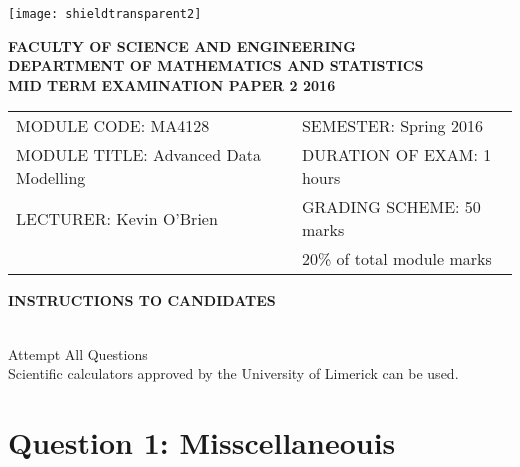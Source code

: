 \documentclass{article}
\begin{document}
{
	\large
\begin{center}
       \texttt{[image: shieldtransparent2]}
\end{center}

\begin{center}
\vspace{1cm}
\large \bf {FACULTY OF SCIENCE AND ENGINEERING} \\[0.5cm]
\normalsize DEPARTMENT OF MATHEMATICS AND STATISTICS \\[1.25cm]
\large \bf {MID TERM EXAMINATION PAPER 2 2016} \\[1.5cm]
\end{center}

\begin{tabular}{ll}
MODULE CODE: MA4128 & SEMESTER: Spring 2016 \\[1cm]
MODULE TITLE: Advanced Data Modelling & DURATION OF EXAM: 1 hours \\[1cm]
LECTURER: Kevin O'Brien & GRADING SCHEME: 50 marks \\
&  \normalsize {20\% of total module marks} \\[0.7cm]

\end{tabular}
\begin{center}
{\bf INSTRUCTIONS TO CANDIDATES}
\end{center}

{\noindent \\ Attempt All Questions
\\ Scientific calculators approved by the University of Limerick can be used. 
}
}

\newpage



\section*{Question 1: Misscellaneouis}
\end{document}
